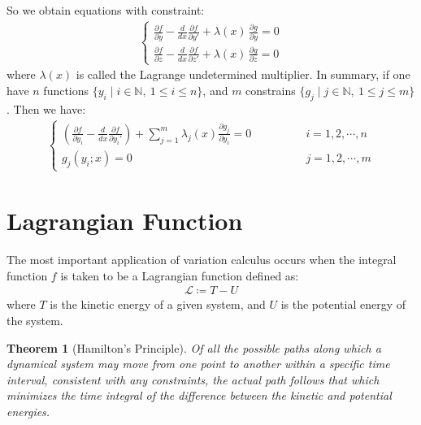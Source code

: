 \documentclass[11pt,oneside]{book}
\theoremstyle{break}
\theoremstyle{break}
\newtheorem{thm}{Theorem}[section]
\newcommand{\N}{\mathbb{N}}
\newcommand{\pd}{\partial}
\begin{document}
So we obtain equations with constraint:
\begin{align*}
\begin{cases}
\frac{\pd f}{\pd y} - \frac{d}{dx}\frac{\pd f}{\pd y'} + \lambda(x) \, \frac{\pd g}{\pd y} = 0\\
\frac{\pd f}{\pd z} - \frac{d}{dx}\frac{\pd f}{\pd z'} + \lambda(x) \, \frac{\pd g}{\pd z} = 0
\end{cases}
\end{align*}
where $\lambda(x)$ is called the Lagrange undetermined multiplier. In summary, if one have $n$ functions $\{y_i \mid i \in \N,\ 1\leq i \leq n\}$, and $m$ constrains $\{g_j \mid j \in \N,\ 1\leq j \leq m\}$. Then we have:
\begin{align*}
\begin{cases}
\left( \frac{\pd f}{\pd y_i}- \frac{d}{dx}\frac{\pd f}{\pd y_i'}\right) + \sum_{j=1}^m \lambda_j(x) \frac{\pd g_j}{\pd y_i} = 0 & \qquad\qquad i=1,2,\cdots, n \\
g_j(y_i; x ) = 0 & \qquad\qquad j = 1,2,\cdots, m
\end{cases}
\end{align*}
\newpage

\section[Lagrangian Function]{\color{red}Lagrangian Function\color{black}}

The most important application of variation calculus occurs when the integral function $f$ is taken to be a Lagrangian function defined as:
\begin{align*}
\mathcal{L} \coloneqq T - U
\end{align*}
where $T$ is the kinetic energy of a given system, and $U$ is the potential energy of the system.

\begin{thm}[Hamilton's Principle]
Of all the possible paths along which a dynamical system may move from one point to another within a specific time interval, consistent with any constraints, the actual path follows that which minimizes the time integral of the difference between the kinetic and potential energies. 
\end{thm}
\end{document}
